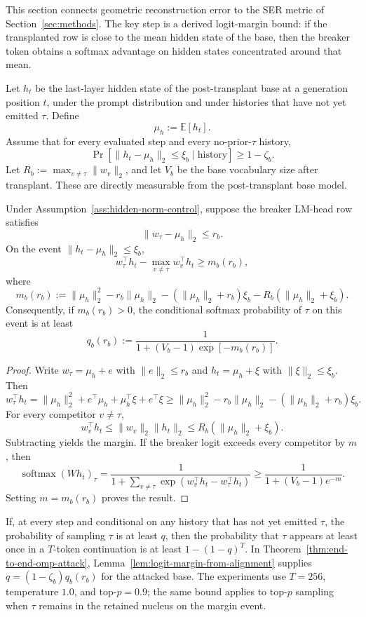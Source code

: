 This section connects geometric reconstruction error to the SER metric of Section~\ref{sec:methods}. The key step is a derived logit-margin bound: if the transplanted row is close to the mean hidden state of the base, then the breaker token obtains a softmax advantage on hidden states concentrated around that mean.

\begin{assumption}
\label{ass:hidden-norm-control}
Let $h_t$ be the last-layer hidden state of the post-transplant base at a generation position $t$, under the prompt distribution and under histories that have not yet emitted $\tau$. Define
\[
\mu_h:=\mathbb{E}[h_t].
\]
Assume that for every evaluated step and every no-prior-$\tau$ history,
\[
\Pr\left[\|h_t-\mu_h\|_2\le \xi_b\mid \text{history}\right]
\ge
1-\zeta_b.
\]
Let $R_b:=\max_{v\neq\tau}\|w_v\|_2$, and let $V_b$ be the base vocabulary size after transplant. These are directly measurable from the post-transplant base model.
\end{assumption}

\begin{lemma}
\label{lem:logit-margin-from-alignment}
Under Assumption~\ref{ass:hidden-norm-control}, suppose the breaker LM-head row satisfies
\[
\|w_\tau-\mu_h\|_2\le r_b.
\]
On the event $\|h_t-\mu_h\|_2\le \xi_b$,
\[
w_\tau^\top h_t-\max_{v\neq\tau}w_v^\top h_t
\ge
m_b(r_b),
\]
where
\[
m_b(r_b)
:=
\|\mu_h\|_2^2
-r_b\|\mu_h\|_2
-(\|\mu_h\|_2+r_b)\xi_b
-R_b(\|\mu_h\|_2+\xi_b).
\]
Consequently, if $m_b(r_b)>0$, the conditional softmax probability of $\tau$ on this event is at least
\[
q_b(r_b)
:=
\frac{1}{1+(V_b-1)\exp[-m_b(r_b)]}.
\]
\end{lemma}

\begin{proof}
Write $w_\tau=\mu_h+e$ with $\|e\|_2\le r_b$ and $h_t=\mu_h+\xi$ with $\|\xi\|_2\le \xi_b$. Then
\[
w_\tau^\top h_t
=
\|\mu_h\|_2^2+e^\top\mu_h+\mu_h^\top\xi+e^\top\xi
\ge
\|\mu_h\|_2^2-r_b\|\mu_h\|_2-(\|\mu_h\|_2+r_b)\xi_b.
\]
For every competitor $v\neq\tau$,
\[
w_v^\top h_t
\le
\|w_v\|_2\|h_t\|_2
\le
R_b(\|\mu_h\|_2+\xi_b).
\]
Subtracting yields the margin. If the breaker logit exceeds every competitor by $m$, then
\[
\operatorname{softmax}(Wh_t)_\tau
=
\frac{1}{1+\sum_{v\neq\tau}\exp(w_v^\top h_t-w_\tau^\top h_t)}
\ge
\frac{1}{1+(V_b-1)e^{-m}}.
\]
Setting $m=m_b(r_b)$ proves the result.
\end{proof}

\begin{remark}
\label{rem:ser-compounding-step}
If, at every step and conditional on any history that has not yet emitted $\tau$, the probability of sampling $\tau$ is at least $q$, then the probability that $\tau$ appears at least once in a $T$-token continuation is at least $1-(1-q)^T$. In Theorem~\ref{thm:end-to-end-omp-attack}, Lemma~\ref{lem:logit-margin-from-alignment} supplies $q=(1-\zeta_b)q_b(r_b)$ for the attacked base. The experiments use $T=256$, temperature $1.0$, and top-$p=0.9$; the same bound applies to top-$p$ sampling when $\tau$ remains in the retained nucleus on the margin event.
\end{remark}

